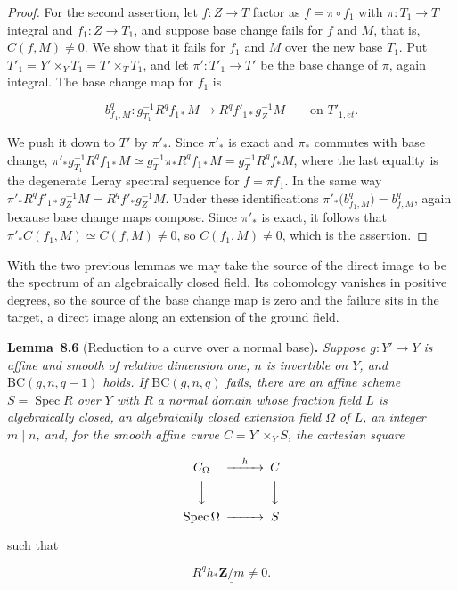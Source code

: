 \documentclass[11pt]{article}
\newenvironment{bpstatement}[2]{\par\addvspace{0.6\baselineskip}\noindent\textbf{#1}#2\textbf{.}\enspace\ignorespaces}
  {\par\addvspace{0.4\baselineskip}}
\newenvironment{bpstatementit}[2]{\begin{bpstatement}{#1}{#2}\itshape\ignorespaces}{\end{bpstatement}}
\begin{document}
\begin{proof}[{Proof}]
For the second assertion, let \(f:Z\to T\) factor as \(f=\pi\circ f_1\) with \(\pi:T_1\to T\) integral and \(f_1:Z\to T_1\), and suppose base change fails for \(f\) and \(M\), that is, \(C(f,M)\neq0\). We show that it fails for \(f_1\) and \(M\) over the new base \(T_1\). Put \(T'_1=Y'\times_YT_1=T'\times_TT_1\), and let \(\pi':T'_1\to T'\) be the base change of \(\pi\), again integral. The base change map for \(f_1\) is

\[
b^q_{f_1,M}:g_{T_1}^{-1}R^qf_{1*}M\longrightarrow R^qf'_{1*}g_Z^{-1}M
\qquad\text{on }T'_{1,\acute{e}t}.
\]

We push it down to \(T'\) by \(\pi'_*\). Since \(\pi'_*\) is exact and \(\pi_*\) commutes with base change, \(\pi'_*g_{T_1}^{-1}R^qf_{1*}M\simeq g_T^{-1}\pi_*R^qf_{1*}M
=g_T^{-1}R^qf_*M\), where the last equality is the degenerate Leray spectral sequence for \(f=\pi f_1\). In the same way \(\pi'_*R^qf'_{1*}g_Z^{-1}M=R^qf'_*g_Z^{-1}M\). Under these identifications \(\pi'_*\bigl(b^q_{f_1,M}\bigr)=b^q_{f,M}\), again because base change maps compose. Since \(\pi'_*\) is exact, it follows that \(\pi'_*C(f_1,M)\simeq C(f,M)\neq0\), so \(C(f_1,M)\neq0\), which is the assertion.
\end{proof}

\label{bp25}%
With the two previous lemmas we may take the source of the direct image to be the spectrum of an algebraically closed field. Its cohomology vanishes in positive degrees, so the source of the base change map is zero and the failure sits in the target, a direct image along an extension of the ground field.

\label{bp26}%
\begin{bpstatementit}{Lemma~8.6}{ (Reduction to a curve over a normal base)}
Suppose \(g:Y'\to Y\) is affine and smooth of relative dimension one, \(n\) is invertible on \(Y\), and \(\mathrm{BC}(g,n,q-1)\) holds. If \(\mathrm{BC}(g,n,q)\) fails, there are an affine scheme \(S=\operatorname{Spec}R\) over \(Y\) with \(R\) a normal domain whose fraction field \(L\) is algebraically closed, an algebraically closed extension field \(\Omega\) of \(L\), an integer \(m\mid n\), and, for the smooth affine curve \(C=Y'\times_YS\), the cartesian square

\[
\begin{CD}
C_\Omega @>{h}>> C\\
@VVV @VVV\\
\operatorname{Spec}\Omega @>>> S
\end{CD}
\]

such that

\[
R^qh_*\underline{\mathbf Z/m}\ne0.
\]
\end{bpstatementit}
\end{document}
